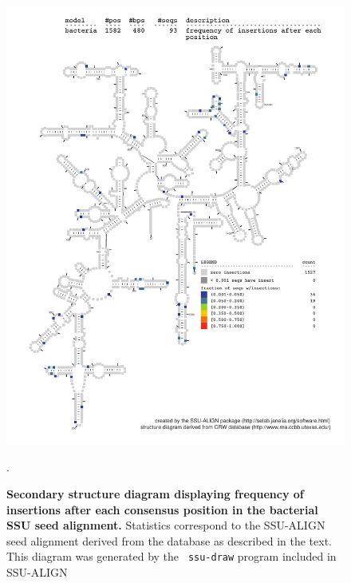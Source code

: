 \begin{figure}
\begin{center}
\includegraphics[width=5.7in]{Figures/bacteria-0p1-ifreq}
\end{center}
\caption[Secondary structure diagram displaying frequency of insertions
  after each consensus position in the bacterial SSU seed
  alignment]{\textbf{Secondary structure diagram displaying frequency
  of insertions after each consensus position in the bacterial SSU seed
  alignment.} Statistics correspond to the SSU-ALIGN seed
  alignment derived from the  database \cite{CannoneGutell02}
  as described in the text. This diagram was generated by the {\tt
  ssu-draw} program included in SSU-ALIGN}.
\label{fig:bacifreq}
\end{figure}

\newpage 

